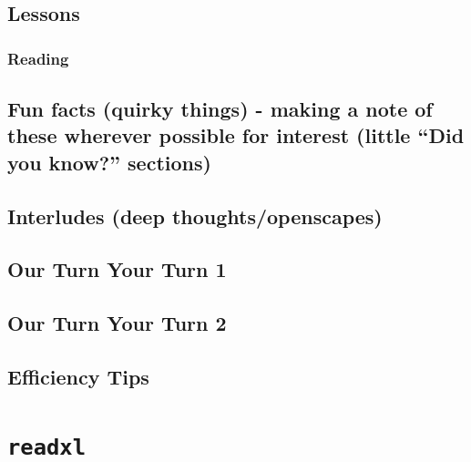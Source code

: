 \documentclass[]{book}
\begin{document}
\hypertarget{lessons}{%
\section{Lessons}\label{lessons}}

\hypertarget{reading}{%
\subsection{Reading}\label{reading}}

\hypertarget{fun-facts-quirky-things---making-a-note-of-these-wherever-possible-for-interest-little-did-you-know-sections-1}{%
\section{Fun facts (quirky things) - making a note of these wherever possible for interest (little ``Did you know?'' sections)}\label{fun-facts-quirky-things---making-a-note-of-these-wherever-possible-for-interest-little-did-you-know-sections-1}}

\hypertarget{interludes-deep-thoughtsopenscapes-2}{%
\section{Interludes (deep thoughts/openscapes)}\label{interludes-deep-thoughtsopenscapes-2}}

\hypertarget{our-turn-your-turn-1}{%
\section{Our Turn Your Turn 1}\label{our-turn-your-turn-1}}

\hypertarget{our-turn-your-turn-2}{%
\section{Our Turn Your Turn 2}\label{our-turn-your-turn-2}}

\hypertarget{efficiency-tips-2}{%
\section{Efficiency Tips}\label{efficiency-tips-2}}

\hypertarget{readxl}{%
\chapter{\texorpdfstring{\texttt{readxl}}{readxl}}\label{readxl}}
\end{document}
